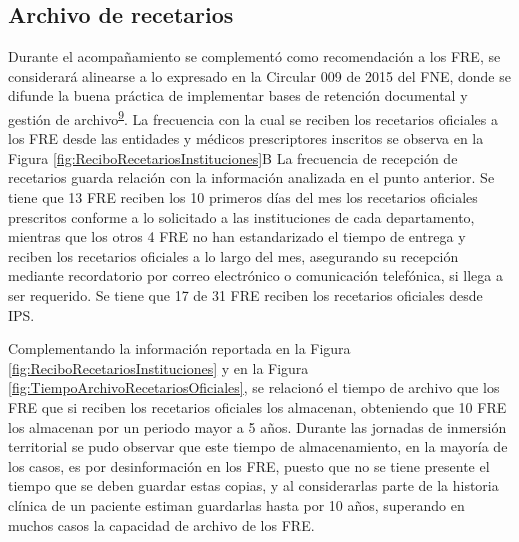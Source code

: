 \documentclass[
]{book}
\begin{document}
\hypertarget{archivo-de-recetarios}{%
\subsection{Archivo de recetarios}\label{archivo-de-recetarios}}

Durante el acompañamiento se complementó como recomendación a los FRE, se considerará alinearse a lo expresado en la Circular 009 de 2015 del FNE, donde se difunde la buena práctica de implementar bases de retención documental y gestión de archivo\textsuperscript{\protect\hyperlink{ref-FNE2015-9}{9}}. La frecuencia con la cual se reciben los recetarios oficiales a los FRE desde las entidades y médicos prescriptores inscritos se observa en la Figura \ref{fig:ReciboRecetariosInstituciones}B La frecuencia de recepción de recetarios guarda relación con la información analizada en el punto anterior. Se tiene que 13 FRE reciben los 10 primeros días del mes los recetarios oficiales prescritos conforme a lo solicitado a las instituciones de cada departamento, mientras que los otros 4 FRE no han estandarizado el tiempo de entrega y reciben los recetarios oficiales a lo largo del mes, asegurando su recepción mediante recordatorio por correo electrónico o comunicación telefónica, si llega a ser requerido. Se tiene que 17 de 31 FRE reciben los recetarios oficiales desde IPS.

Complementando la información reportada en la Figura \ref{fig:ReciboRecetariosInstituciones} y en la Figura \ref{fig:TiempoArchivoRecetariosOficiales}, se relacionó el tiempo de archivo que los FRE que si reciben los recetarios oficiales los almacenan, obteniendo que 10 FRE los almacenan por un periodo mayor a 5 años. Durante las jornadas de inmersión territorial se pudo observar que este tiempo de almacenamiento, en la mayoría de los casos, es por desinformación en los FRE, puesto que no se tiene presente el tiempo que se deben guardar estas copias, y al considerarlas parte de la historia clínica de un paciente estiman guardarlas hasta por 10 años, superando en muchos casos la capacidad de archivo de los FRE.
\end{document}
